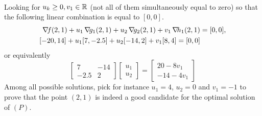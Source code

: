 \begin{example}
\begin{align*}
\end{align*}
Looking for $u_k \geq 0, v_1 \in \mathbb{R}$ (not all of them simultaneously equal to zero) so that the following linear combination is equal to $[0,0]$.
\begin{align*}
\mathop{\nabla\! {f}}(2,1) + u_1 \mathop{\nabla\! {g_1}}(2,1) + u_2 \mathop{\nabla\! {g_2}}(2,1) + v_1 \mathop{\nabla\! {h_1}}(2,1) &= [0,0], \\
[-20,14] + u_1 [7,-2.5] + u_2 [-14,2] + v_1 [8,4] = [0,0]
\end{align*}
or equivalently
\begin{equation*}
\begin{bmatrix} 7 & -14 \\ -2.5 & 2 \end{bmatrix} \begin{bmatrix} u_1 \\ u_2 \end{bmatrix} = \begin{bmatrix} 20 - 8v_1 \\ -14-4v_1 \end{bmatrix}
\end{equation*}
Among all possible solutions, pick for instance $u_1=4$, $u_2=0$ and $v_1=-1$ to prove that the point $(2,1)$ is indeed a good candidate for the optimal solution of $(P)$.
\end{example}
